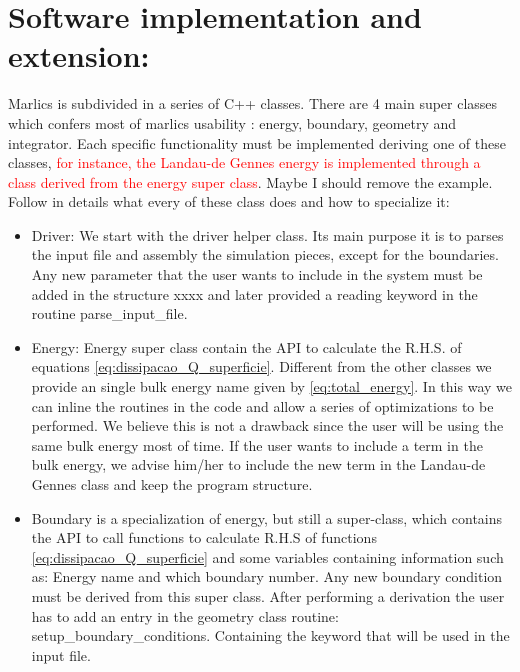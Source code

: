 \documentclass[final,5p,times,twocolumn]{elsarticle}
\begin{document}
\section{Software implementation and extension:}\label{apx:extending_marlics}

Marlics is subdivided in a series of C++ classes. There are 4 main
super classes which confers most of marlics usability : energy,
boundary, geometry and integrator. Each specific functionality must be
implemented deriving one of these classes, \textcolor{red}{for
  instance, the Landau-de Gennes energy is implemented through a class
  derived from the energy super class}. Maybe I should remove the
example. Follow in details what every of these class does and how to specialize it:

\begin{itemize}

\item Driver: We start with the driver helper class. Its main purpose
  it is to parses the input file and assembly the simulation pieces,
  except for the boundaries. Any new parameter that the user wants to
  include in the system must be added in the structure xxxx and later
  provided a reading keyword in the routine parse_input_file.


  
\item Energy: Energy super class contain the API to calculate the
  R.H.S. of equations \eqref{eq:dissipacao_Q_superficie}. Different
  from the other classes we provide an single bulk energy name given
  by \eqref{eq:total_energy}. In this way we can inline the routines
  in the code and allow a series of optimizations to be performed. We
  believe this is not a drawback since the user will be using the same
  bulk energy most of time. If the user wants to include a term in the
  bulk energy, we advise him/her to include the new term in the
  Landau-de Gennes class and keep the program structure.
  
\item Boundary is a specialization of energy, but still a super-class,
  which contains the API to call functions to calculate R.H.S of
  functions \eqref{eq:dissipacao_Q_superficie} and some variables
  containing information such as: Energy name and which boundary
  number. Any new boundary condition must be derived from this super
  class. After performing a derivation the user has to add an entry in
  the geometry class routine: setup_boundary_conditions. Containing
  the keyword that will be used in the input file.


\end{itemize}
\end{document}
